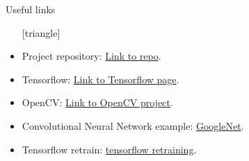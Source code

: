 \documentclass{beamer}
\begin{document}
\begin{frame}{Useful links}
	\begin{itemize}
		\setlength\itemsep{1em}
		[triangle]
		\item 
			Project repository: \href{https://github.com/SimoneCaldarella/faceRecognition}{\color{red}Link to repo}.
		\item 
			Tensorflow: \href{https://www.tensorflow.org}{\color{red}Link to Tensorflow page}.
		\item 
			OpenCV: \href{https://opencv.org}{\color{red}Link to OpenCV project}.
		\item 
			Convolutional Neural Network example: \href{https://bit.ly/2vBgoO3}{\color{red}GoogleNet}.
		\item 
			Tensorflow retrain: \href{https://www.tensorflow.org/hub/tutorials/image_retraining}{\color{red}tensorflow retraining}.
	\end{itemize}
\end{frame}
\end{document}
